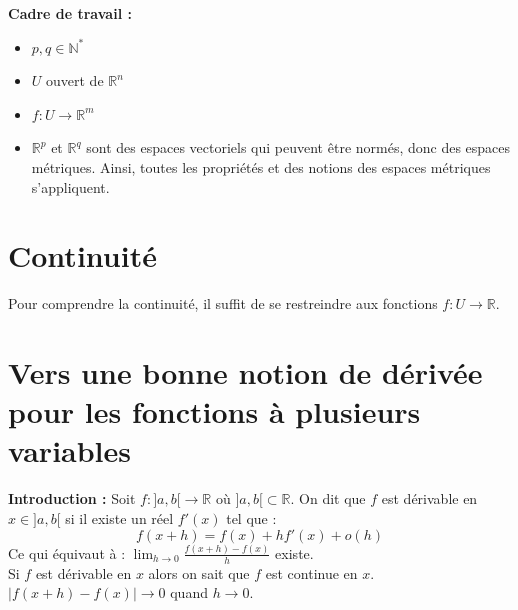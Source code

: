 \documentclass{article}
\begin{document}

\textbf{Cadre de travail :}
\begin{itemize}
    \item $p,q \in \mathbb{N}^*$
    \item $U$ ouvert de $\mathbb{R}^n$
    \item $f : U \to \mathbb{R}^m$
    \item $\mathbb{R}^p$ et $\mathbb{R}^q$ sont des espaces vectoriels qui peuvent être normés, donc des espaces métriques. Ainsi, toutes les propriétés et des notions des espaces métriques s'appliquent.
\end{itemize}

\section{Continuité}




Pour comprendre la continuité, il suffit de se restreindre aux fonctions $f : U \to \mathbb{R}$.\\

\section{Vers une bonne notion de dérivée pour les fonctions à plusieurs variables}

\textbf{Introduction :} Soit $f \colon ]a,b[ \to \mathbb{R}$ où $]a,b[ \subset \mathbb{R}$.
On dit que $f$ est dérivable en $x \in ]a,b[$ si il existe un réel $f'(x)$ tel que : 
\[
    f(x+h) = f(x) + hf'(x) + o(h)
\]
Ce qui équivaut à : $\lim_{h \to 0} \frac{f(x+h) - f(x)}{h}$ existe.\\
Si $f$ est dérivable en $x$ alors on sait que $f$ est continue en $x$.\\
$|f(x+h) - f(x)| \to 0$ quand $h \to 0$.
\end{document}

